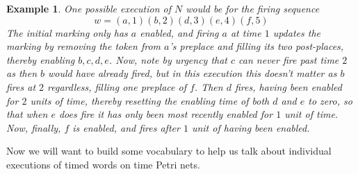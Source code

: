 \documentclass[conference]{IEEEtran}
\newcommand\eye{\ensurestackMath{\stackinset{c}{}{c}{-.33pt}%
		{\bullet}{\bigcirc}}}
\newtheorem{example}{Example}
\begin{document}
\begin{example}
		One possible execution of $N$ would be for the firing sequence $$w = (a, 1)(b, 2)(d, 3)(e, 4)(f,5)$$ The initial marking only has $a$ enabled, and firing $a$ at time $1$ updates the marking by removing the token from $a$'s preplace and filling its two post-places, thereby enabling $b, c, d, e$. Now, note by urgency that $c$ can never fire past time $2$ as then $b$ would have already fired, but in this execution this doesn't matter as $b$ fires at $2$ regardless, filling one preplace of $f$. Then $d$ fires, having been enabled for $2$ units of time, thereby resetting the enabling time of both $d$ and $e$ to zero, so that when $e$ does fire it has only been most recently enabled for $1$ unit of time. Now, finally, $f$ is enabled, and fires after $1$ unit of having been enabled. 
	\end{example}
	
	Now we will want to build some vocabulary to help us talk about individual executions of timed words on time Petri nets. 
	
\end{document}
